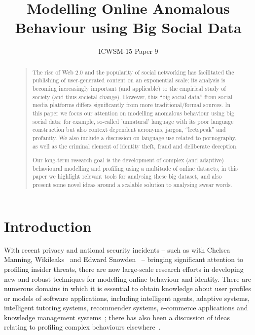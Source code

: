 \documentclass[letterpaper]{article}
\begin{document}
\title{Modelling Online Anomalous Behaviour using Big Social Data}
\author{ICWSM-15 Paper 9}

\maketitle

\begin{abstract}
\begin{quote}
The rise of Web 2.0 and the popularity of social networking has
facilitated the publishing of user-generated content on an exponential
scale; its analysis is becoming increasingly important (and
applicable) to the empirical study of society (and thus societal
change). However, this ``big social data'' from social media platforms
differs significantly from more traditional/formal sources.  In this
paper we focus our attention on modelling anomalous behaviour using
big social data; for example, so-called 'unnatural' language with its
poor language construction but also context dependent acronyms,
jargon, ``leetspeak'' and profanity. We also include a discussion on
language use related to pornography, as well as the criminal element
of identity theft, fraud and deliberate deception.

Our long-term research goal is the development of complex (and
adaptive) behavioural modelling and profiling using a multitude of
online datasets; in this paper we highlight relevant tools for
analysing these big dataset, and also present some novel ideas around
a scalable solution to analysing swear words.
\end{quote}
\end{abstract}


\section{Introduction}

With recent privacy and national security incidents -- such as with
Chelsea Manning, Wikileaks~\cite{wikileaks:2013} and Edward
Snowden~\cite{greenwald:2014} -- bringing significant attention to
profiling insider threats, there are now large-scale research efforts
in developing new and robust techniques for modelling online behaviour
and identity. There are numerous domains in which it is essential to
obtain knowledge about user profiles or models of software
applications, including intelligent agents, adaptive systems,
intelligent tutoring systems, recommender systems, e-commerce
applications and knowledge management
systems~\cite{schiaffino+amandi:2009}; there has also been a
discussion of ideas relating to profiling complex behaviours
elsewhere~\cite{oatley+crick:2014}.
\end{document}

